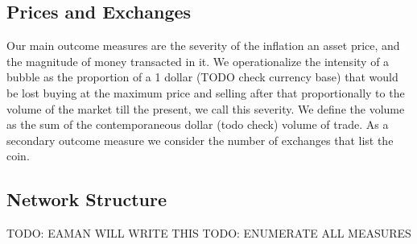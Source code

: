 \subsection{Prices and Exchanges}
Our main outcome measures are the severity of the inflation an asset price, and the magnitude of money transacted in it.
We operationalize the intensity of a bubble as the proportion of a 1 dollar (TODO check currency base) that would be lost buying at the maximum price and selling after that proportionally to the volume of the market till the present, we call this severity.
We define the volume as the sum of the contemporaneous dollar (todo check) volume of trade.
As a secondary outcome measure we consider the number of exchanges that list the coin.


\subsection{Network Structure}
TODO: EAMAN WILL WRITE THIS
TODO: ENUMERATE ALL MEASURES
